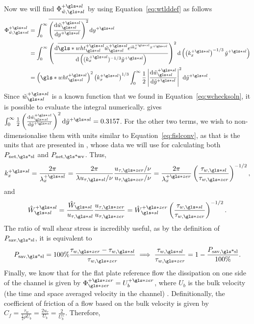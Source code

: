 Now we will find $\Phi _{\tilde{w},\gls*{sl}}\ps$ by using Equation~\eqref{eq:wtlddef} as follows
\begin{align}
	\Phi _{\tilde{w},\gls*{sl}}\ps &= \int_{0}^{\infty} \overline{\left( \dv{\tilde{w}\ssl\ps}{y\ps}  \right) ^2} \dd{y\ps}   \\
				       &= \int_{0}^{\infty} \left( \dv{\overline{\gls*{wht}\ps\ssl\check{w}\ssl\ps e^{ik\ps_x x\ps}}}{\left((k_x\ps)^{-1 /3}\check{y}\ps\right)}  \right) ^2 \dd{\left(\left(k_x\ps\right)^{-1 /3}\check{y}\ps\right)}   \\
				       &= \left(\gls*{wht}\ps\ssl\right)^2\left(k_x\ps\right)^{1 /3}\int_{0}^{\infty}\frac{1}{2} \left| \dv{\check{w}\ssl\ps}{\check{y}\ps}  \right| ^2 \dd{\check{y}\ps} \label{eq:fislps}
.\end{align}
Since $\check{w}\ssl\ps$ is a known function that we found in Equation~\eqref{eq:wchecksoln}, it is possible to evaluate the integral numerically. \textcite{chernyshenko2013} gives $\int_{0}^{\infty}  \frac{1}{2} \left( \dv{\check{w}\ssl\ps}{\check{y}\ps}  \right) ^2 \dd{\check{y}\ps} = 0.3157$. For the other two terms, we wish to non-dimensionalise them with \pz units similar to Equation~\eqref{eq:fislconv}, as that is the units that are presented in \textcite{viotti2009}, whose data we will use for calculating both $P_\text{net,\gls*{sl}} $ and $P_\text{net,\gls*{wv}} $. Thus,
\begin{equation}
	k_x\ps=\frac{2\pi}{\lambda_x\ps}=\frac{2\pi}{\lambda u_{\tau,\gls*{sl}}/\nu}\frac{u_{\tau,\gls*{zer}}/\nu}{u_{\tau,\gls*{zer}}/\nu}=\frac{2\pi}{\lambda_x\pz}\left( \frac{\tau_{w,\gls*{sl}}}{\tau_{w,\gls*{zer}}} \right) ^{-1 /2}\label{eq:kxslconv}
,\end{equation}
and
\begin{equation}
	\hat{W}\ps\ssl=\frac{\hat{W}\ssl}{u_{\tau,\gls*{sl}}}\frac{u_{\tau,\gls*{zer}}}{u_{\tau,\gls*{zer}}}=\hat{W}\ssl\pz\left( \frac{\tau_{w,\gls*{sl}}}{\tau_{w,\gls*{zer}}} \right) ^{-1 /2}\label{eq:whtslconv}
.\end{equation}
The ratio of wall shear stress is incredibly useful, as by the definition of $P_\text{sav,\gls*{sl}} $, it is equivalent to
\begin{equation}
	P_\text{sav,\gls*{sl}}=100\%\frac{\tau_{w,\gls*{zer}}-\tau_{w,\gls*{sl}}}{\tau_{w,\gls*{zer}}}\implies \frac{\tau_{w,\gls*{sl}}}{\tau_{w,\gls*{zer}}}= 1-\frac{ P_\text{sav,\gls*{sl}} }{100\%} \label{eq:taupsavconv}
.\end{equation}
Finally, we know that for the flat plate reference flow the dissipation on one side of the channel is given by	$\Phi \pz\zz = U_b\pz$, where $U_b$ is the bulk velocity (the time and space averaged velocity in the channel) \cite{chernyshenko2013}. Definitionally, the coefficient of friction of a flow based on the bulk velocity is given by $C_f=\frac{\tau_w}{\frac{1}{2}\rho U_b}=\frac{2u_{\tau}}{U_b}=\frac{2}{U_b^{+}}$. Therefore,
